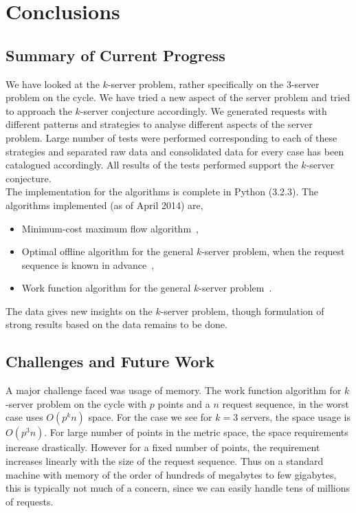 \chapter{Conclusions}\label{ch:conclusions}
\section{Summary of Current Progress}\label{sec:current-progress}

We have looked at the $k$-server problem, rather specifically on the 3-server problem on the cycle. We have tried a new aspect of the server problem and tried to approach the $k$-server conjecture accordingly. We generated requests with different patterns and strategies to analyse different aspects of the server problem. Large number of tests were performed corresponding to each of these strategies and separated raw data and consolidated data for every case has been catalogued accordingly.  All results of the tests performed support the $k$-server conjecture. \\
The implementation for the algorithms is complete in Python (3.2.3). The algorithms implemented (as of April 2014) are,
\begin{itemize}
\item
Minimum-cost maximum flow algorithm~\cite{Tar-b, AMO-b}, 
\item
Optimal offline algorithm for the general $k$-server problem, when the request sequence is known in advance~\cite{CKPV91},
\item
Work function algorithm for the general $k$-server problem~\cite{KP94}.
\end{itemize}
The data gives new insights on the $k$-server problem, though formulation of strong results based on the data remains to be done.

\section{Challenges and Future Work}\label{sec:future-work}

A major challenge faced was usage of memory. The work function algorithm for $k$-server problem on the cycle with $p$ points and a $n$ request sequence, in the worst case uses $O(p^kn)$ space. For the case we see for $k=3$ servers, the space usage is $O(p^3n)$. For large number of points in the metric space, the space requirements increase drastically. However for a fixed number of points, the requirement increases linearly with the size of the request sequence. Thus on a standard machine with memory of the order of hundreds of megabytes to few gigabytes, this is typically not much of a concern, since we can easily handle tens of millions of requests.

